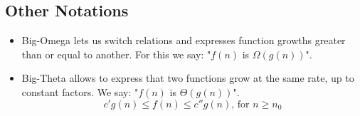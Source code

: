 \documentclass[../Main.tex]{subfiles}
\begin{document}
\subsection{Other Notations}
\begin{itemize}
    \item Big-Omega lets us switch relations and expresses function growths greater than or equal to another.
    For this we say: "\(f(n)\) is \(\Omega(g(n))\)".
    \item Big-Theta allows to express that two functions grow at the same rate, up to constant factors.
    We say: "\(f(n)\) is \(\Theta(g(n))\)".
    \begin{equation}
        c'g(n) \leq f(n) \leq c''g(n) \text{, for } n \geq n_0
    \end{equation}
\end{itemize}
\end{document}
